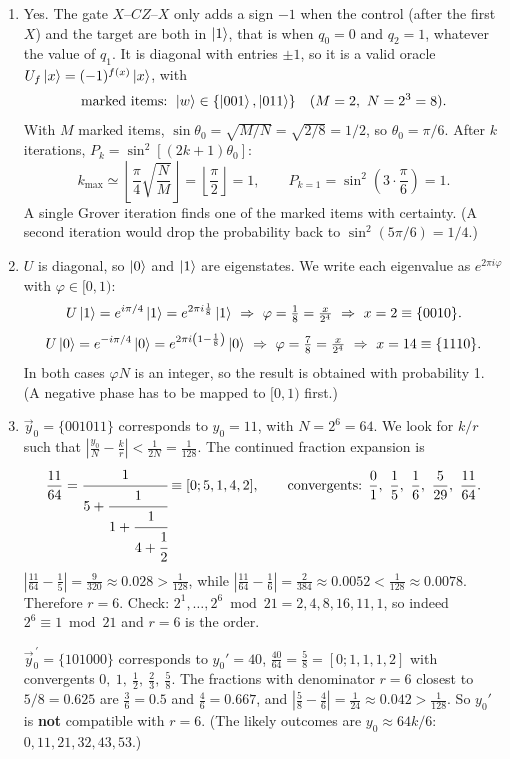 \documentclass[11pt,a4paper]{article}
\begin{document}
\begin{enumerate}
\item Yes. The gate $X$--$CZ$--$X$ only adds a sign $-1$ when the control (after the first $X$) and
the target are both in $\ket1$, that is when $q_0=0$ and $q_2=1$, whatever the value of $q_1$. It is
diagonal with entries $\pm1$, so it is a valid oracle $U_f\ket{x}=(-1)^{f(x)}\ket{x}$, with
\[
\text{marked items: } \ket{w}\in\{\ket{001},\ket{011}\}\quad(M=2,\ N=2^3=8).
\]
With $M$ marked items, $\sin\theta_0=\sqrt{M/N}=\sqrt{2/8}=1/2$, so $\theta_0=\pi/6$. After $k$
iterations, $P_k=\sin^2[(2k+1)\theta_0]$:
\[
k_{\max}\simeq\left\lfloor\frac{\pi}{4}\sqrt{\frac{N}{M}}\right\rfloor=\left\lfloor\frac{\pi}{2}\right\rfloor=1,
\qquad P_{k=1}=\sin^2\!\left(3\cdot\frac{\pi}{6}\right)=1 .
\]
A single Grover iteration finds one of the marked items with certainty. (A second iteration
would drop the probability back to $\sin^2(5\pi/6)=1/4$.)

\item $U$ is diagonal, so $\ket0$ and $\ket1$ are eigenstates. We write each eigenvalue as
$e^{2\pi i\varphi}$ with $\varphi\in[0,1)$:
\[
U\ket1=e^{i\pi/4}\ket1=e^{2\pi i\frac18}\ket1\ \Rightarrow\ \varphi=\tfrac18=\tfrac{x}{2^4}\ \Rightarrow\ x=2\equiv\{0010\}.
\]
\[
U\ket0=e^{-i\pi/4}\ket0=e^{2\pi i\left(1-\frac18\right)}\ket0\ \Rightarrow\ \varphi=\tfrac78=\tfrac{x}{2^4}\ \Rightarrow\ x=14\equiv\{1110\}.
\]
In both cases $\varphi N$ is an integer, so the result is obtained with probability 1. (A negative
phase has to be mapped to $[0,1)$ first.)

\item $\vec y_0=\{001011\}$ corresponds to $y_0=11$, with $N=2^6=64$. We look for $k/r$ such that
$\left|\frac{y_0}{N}-\frac kr\right|<\frac1{2N}=\frac1{128}$. The continued fraction expansion is
\[
\frac{11}{64}=\cfrac{1}{5+\cfrac{1}{1+\cfrac{1}{4+\cfrac12}}}\equiv[0;5,1,4,2],
\qquad\text{convergents: } \frac01,\ \frac15,\ \frac16,\ \frac5{29},\ \frac{11}{64}.
\]
$\left|\frac{11}{64}-\frac15\right|=\frac{9}{320}\approx0.028>\frac1{128}$, while
$\left|\frac{11}{64}-\frac16\right|=\frac{2}{384}\approx0.0052<\frac1{128}\approx0.0078$. Therefore
$r=6$. Check: $2^1,\dots,2^6 \bmod 21 = 2,4,8,16,11,1$, so indeed $2^6\equiv1\bmod 21$ and $r=6$ is the order.

$\vec y_0^{\,\prime}=\{101000\}$ corresponds to $y_0'=40$, $\frac{40}{64}=\frac58=[0;1,1,1,2]$ with
convergents $0,\ 1,\ \frac12,\ \frac23,\ \frac58$. The fractions with denominator $r=6$ closest to
$5/8=0.625$ are $\frac36=0.5$ and $\frac46=0.667$, and
$\left|\frac58-\frac46\right|=\frac1{24}\approx0.042>\frac1{128}$. So $y_0'$ is \textbf{not}
compatible with $r=6$. (The likely outcomes are $y_0\approx 64k/6$: $0,11,21,32,43,53$.)
\end{enumerate}
\end{document}

